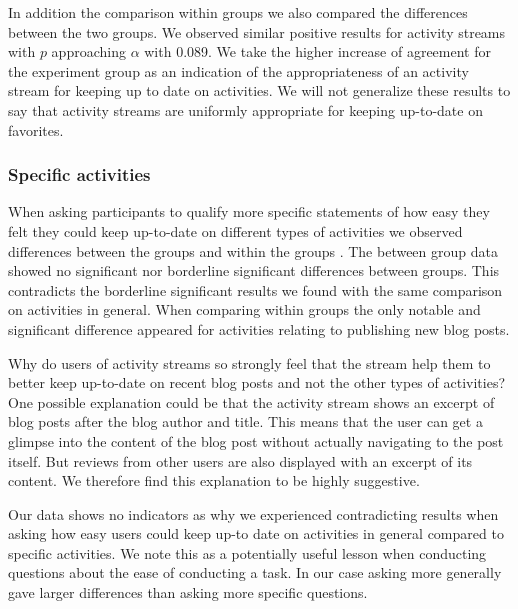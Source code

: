 In addition the comparison within
groups we also compared the differences between the two groups. We observed
similar positive results for activity streams with $p$ approaching $\alpha$
with 0.089.
We take the higher increase of agreement for the experiment
group as an indication of the appropriateness of an activity stream for keeping
up to date on activities. We will not generalize these results to say that
activity streams are uniformly appropriate for keeping up-to-date on
favorites.

\subsubsection{Specific activities}

When asking participants to qualify more specific statements of how
easy they felt they could keep up-to-date on different types of activities
we observed differences between%
the groups and within the groups%
.
The between group data showed no significant nor borderline significant
differences between groups. This contradicts the borderline significant
results we found with the same comparison on activities in general.
When comparing within groups the only notable and significant difference
appeared for activities relating to publishing new blog posts.

Why do users of activity streams so strongly feel that the stream help them to
better keep up-to-date on recent blog posts and not the other types of
activities? One possible explanation could be that the activity stream
shows an excerpt of blog posts after the blog author and title.%
This means
that the user can get a glimpse into the content of the blog post without
actually navigating to the post itself.
But reviews from other users are also displayed with an excerpt of its
content. We therefore find this explanation to be highly suggestive.

Our data shows no indicators as why we experienced contradicting results
when asking how easy users could keep up-to date on activities in general
compared to specific activities. We note this as a potentially useful lesson
when conducting questions about the ease of conducting a task. In our case
asking more generally gave larger differences than asking more specific
questions.

